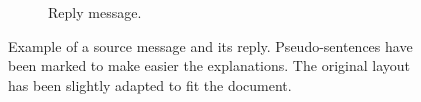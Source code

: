 \begin{figure}
{{\begin{subfigure}[b]{0.9\textwidth}
                \caption{Reply message.}
                \label{fig:exampleReply}
        \end{subfigure}
}}



        \caption{Example of a source message and its reply. Pseudo-sentences have been marked to make easier the explanations. The original layout has been slightly adapted to fit the document.}\label{fig:exampleSourCeReplyMessage}

\end{figure}




